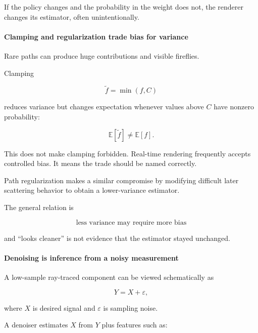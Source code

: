 If the policy changes and the probability in the weight does not, the renderer changes its estimator, often unintentionally.

\paragraph{Clamping and regularization trade bias for variance}\label{03-visual-computing-i-ch001-clamping-and-regularization-trade-bias-for-variance}

\hypertarget{03-visual-computing-i-ch001-clamping-and-regularization-trade-bias-for-variance}{}

Rare paths can produce huge contributions and visible fireflies.

Clamping

\[
\widetilde f=\min(f,C)
\]

reduces variance but changes expectation whenever values above \(C\) have nonzero probability:

\[
\mathbb E[\widetilde f]\neq\mathbb E[f].
\]

This does not make clamping forbidden. Real-time rendering frequently accepts controlled bias. It means the trade should be named correctly.

Path regularization makes a similar compromise by modifying difficult later scattering behavior to obtain a lower-variance estimator.

The general relation is

\[
\boxed{
\text{less variance may require more bias}
}
\]

and ``looks cleaner'' is not evidence that the estimator stayed unchanged.

\paragraph{Denoising is inference from a noisy measurement}\label{03-visual-computing-i-ch001-denoising-is-inference-from-a-noisy-measurement}

\hypertarget{03-visual-computing-i-ch001-denoising-is-inference-from-a-noisy-measurement}{}

A low-sample ray-traced component can be viewed schematically as

\[
Y=X+\varepsilon,
\]

where \(X\) is desired signal and \(\varepsilon\) is sampling noise.

A denoiser estimates \(X\) from \(Y\) plus features such as:

